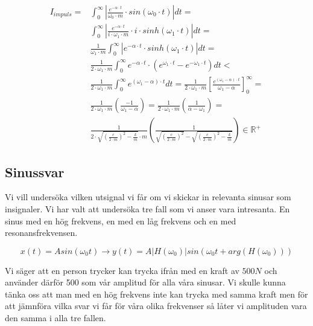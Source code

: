 \documentclass[10pt,a4paper]{article}
\begin{document}
\begin{itemize}
\begin{equation}
\begin{split}
I_{impuls}= & \int_{0}^{\infty}\left|\frac{e^{-\alpha\cdot t}}{\omega_0 \cdot m}\cdot sin(\omega_0\cdot t)\right|dt=\\ & \int_{0}^{\infty}\left|\frac{e^{-\alpha\cdot t}}{i\cdot\omega_1 \cdot m}\cdot i\cdot sinh(\omega_1\cdot t)\right|dt=\\ & \frac{1}{\omega_1 \cdot m}\int_{0}^{\infty}\left|e^{-\alpha\cdot t}\cdot sinh(\omega_1\cdot t)\right|dt=\\ & \frac{1}{2 \cdot\omega_1 \cdot m}\int_{0}^{\infty}e^{-\alpha\cdot t}\cdot \left( e^{\omega_1\cdot t}-e^{-\omega_1\cdot t} \right) dt< \\ & \frac{1}{2\cdot\omega_1 \cdot m}\int_{0}^{\infty}e^{(\omega_1-\alpha)\cdot t} dt=\frac{1}{2\cdot\omega_1 \cdot m}\left[\frac{e^{(\omega_1-\alpha)\cdot t}}{\omega_1-\alpha} \right]_{0}^{\infty}=\\ & \frac{1}{2\cdot\omega_1 \cdot m}\left(\frac{-1}{\omega_1-\alpha} \right)=\frac{1}{2\cdot\omega_1 \cdot m}\left(\frac{1}{\alpha-\omega_1} \right)=\\ & \frac{1}{2\cdot   \sqrt{\left(\frac{c}{2\cdot m}\right)^2-\frac{k}{m}}   \cdot m}\left(\frac{1}{\sqrt{\left(\frac{c}{2\cdot m}\right)^2}-\sqrt{\left(\frac{c}{2\cdot m}\right)^2-\frac{k}{m}}} \right)\in \mathbb{R}^+
\end{split}
\end{equation}
\end{itemize}

\subsection{Sinussvar}
Vi vill undersöka vilken utsignal vi får om vi skickar in relevanta sinusar som insignaler. Vi har valt att undersöka tre fall som vi anser vara intresanta. En sinus med en hög frekvens, en med en låg frekvens och en med resonansfrekvensen.

\begin{equation}
x(t) = A sin(\omega_0t) \rightarrow y(t) = A|H(\omega_0)|sin(\omega_0t + arg(H(\omega_0)))
\end{equation}

Vi säger att en person trycker kan trycka ifrån med en kraft av $500N$ och använder därför 500 som vår amplitud för alla våra sinusar. Vi skulle kunna tänka oss att man med en hög frekvens inte kan trycka med samma kraft men för att jämnföra vilka svar vi får för våra olika frekvenser så låter vi amplituden vara den samma i alla tre fallen.
\end{document}
